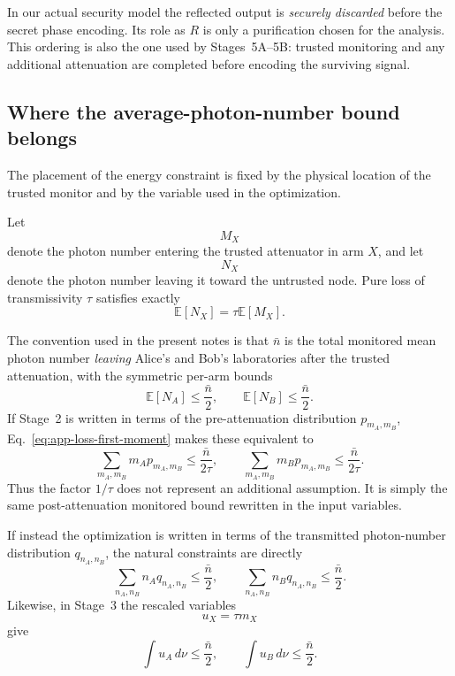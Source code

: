 \documentclass[11pt]{article}
\theoremstyle{remark}
\begin{document}
In our actual security model the reflected output is \emph{securely
discarded} before the secret phase encoding.  Its role as \(R\) is only a
purification chosen for the analysis.  This ordering is also the one
used by Stages~5A--5B: trusted monitoring and any additional attenuation
are completed before encoding the surviving signal.

\subsection{Where the average-photon-number bound belongs}
\label{app:energy-bound-placement}

The placement of the energy constraint is fixed by the physical location of
the trusted monitor and by the variable used in the optimization.

Let
\[
    M_X
\]
denote the photon number entering the trusted attenuator in arm \(X\), and
let
\[
    N_X
\]
denote the photon number leaving it toward the untrusted node.  Pure loss of
transmissivity \(\tau\) satisfies exactly
\begin{equation}
    \mathbb E[N_X]
    =
    \tau\mathbb E[M_X].
    \label{eq:app-loss-first-moment}
\end{equation}

The convention used in the present notes is that
\(\bar n\) is the total monitored mean photon number \emph{leaving} Alice's
and Bob's laboratories after the trusted attenuation, with the symmetric
per-arm bounds
\begin{equation}
    \mathbb E[N_A]
    \le
    \frac{\bar n}{2},
    \qquad
    \mathbb E[N_B]
    \le
    \frac{\bar n}{2}.
    \label{eq:app-output-energy-bound}
\end{equation}
If Stage~2 is written in terms of the pre-attenuation distribution
\(p_{m_A,m_B}\), Eq.~\eqref{eq:app-loss-first-moment} makes these equivalent
to
\begin{equation}
    \sum_{m_A,m_B}
      m_Ap_{m_A,m_B}
    \le
    \frac{\bar n}{2\tau},
    \qquad
    \sum_{m_A,m_B}
      m_Bp_{m_A,m_B}
    \le
    \frac{\bar n}{2\tau}.
    \label{eq:app-input-energy-bound}
\end{equation}
Thus the factor \(1/\tau\) does not represent an additional assumption.  It
is simply the same post-attenuation monitored bound rewritten in the input
variables.

If instead the optimization is written in terms of the transmitted
photon-number distribution \(q_{n_A,n_B}\), the natural constraints are
directly
\[
    \sum_{n_A,n_B}n_Aq_{n_A,n_B}
    \le\frac{\bar n}{2},
    \qquad
    \sum_{n_A,n_B}n_Bq_{n_A,n_B}
    \le\frac{\bar n}{2}.
\]
Likewise, in Stage~3 the rescaled variables
\[
    u_X=\tau m_X
\]
give
\begin{equation}
    \int u_A\,d\nu
    \le\frac{\bar n}{2},
    \qquad
    \int u_B\,d\nu
    \le\frac{\bar n}{2}.
    \label{eq:app-continuum-energy-bound}
\end{equation}
\end{document}

